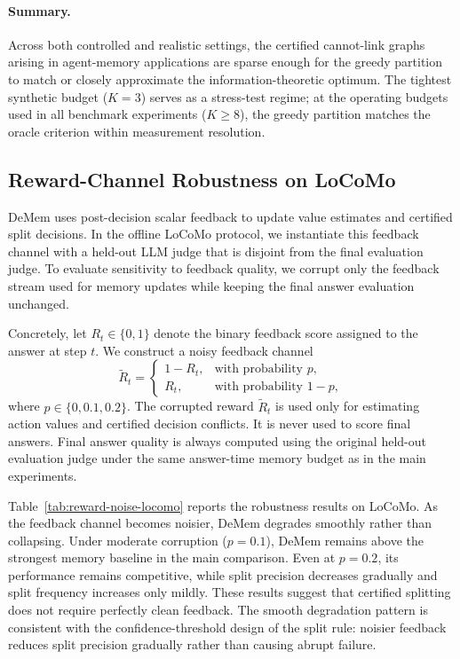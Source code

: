 \documentclass{article}
\theoremstyle{plain}
\theoremstyle{definition}
\theoremstyle{remark}
\begin{document}
\paragraph{Summary.}
Across both controlled and realistic settings, the certified cannot-link graphs
arising in agent-memory applications are sparse enough for the greedy partition
to match or closely approximate the information-theoretic optimum. The tightest
synthetic budget ($K=3$) serves as a stress-test regime; at the operating
budgets used in all benchmark experiments ($K\ge 8$), the greedy partition
matches the oracle criterion within measurement resolution.


\subsection{Reward-Channel Robustness on LoCoMo}
\label{app:reward-noise}

DeMem uses post-decision scalar feedback to update value estimates and certified
split decisions. In the offline LoCoMo protocol, we instantiate this feedback
channel with a held-out LLM judge that is disjoint from the final evaluation
judge. To evaluate sensitivity to feedback quality, we corrupt only the feedback
stream used for memory updates while keeping the final answer evaluation
unchanged.

Concretely, let \(R_t \in \{0,1\}\) denote the binary feedback score assigned
to the answer at step \(t\). We construct a noisy feedback channel
\[
\widetilde{R}_t =
\begin{cases}
1 - R_t, & \text{with probability } p,\\
R_t, & \text{with probability } 1-p,
\end{cases}
\]
where \(p \in \{0, 0.1, 0.2\}\). The corrupted reward
\(\widetilde{R}_t\) is used only for estimating action values and certified
decision conflicts. It is never used to score final answers. Final answer
quality is always computed using the original held-out evaluation judge under
the same answer-time memory budget as in the main experiments.

Table~\ref{tab:reward-noise-locomo} reports the robustness results on LoCoMo.
As the feedback channel becomes noisier, DeMem degrades smoothly rather than
collapsing. Under moderate corruption (\(p=0.1\)), DeMem remains above the
strongest memory baseline in the main comparison. Even at \(p=0.2\), its
performance remains competitive, while split precision decreases gradually and
split frequency increases only mildly. These results suggest that certified
splitting does not require perfectly clean feedback. The smooth degradation pattern is consistent with the confidence-threshold
design of the split rule: noisier feedback reduces split precision gradually
rather than causing abrupt failure.
\end{document}
